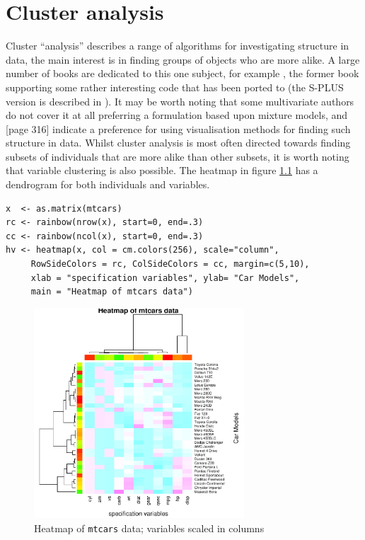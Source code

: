 \chapter{Cluster analysis}
\label{clustan}

Cluster ``analysis'' describes a range of algorithms for investigating structure in data, the main interest is in finding groups of objects who are more alike.  A large number of books are dedicated to this one subject, for example \cite{Kaufman+Rousseeuw:1989,Everitt+etal:2001,Gordon:1999}, the former book supporting some rather interesting code that has been ported to \R (the S-PLUS version is described in  \cite{Struyf+etal:1997}).   It may be worth noting that some multivariate authors do not cover it at all \cite{Flury:1997} preferring a formulation based upon mixture models, and [page 316] \cite{Venables+Ripley:2002} indicate a preference for using visualisation methods for finding such structure in data.  Whilst cluster analysis is most often directed towards finding subsets of individuals that are more alike than other subsets, it is worth noting that variable clustering is also possible.   The heatmap in figure \ref{heatmap} has a dendrogram for both individuals and variables.

\singlespacing
\begin{verbatim}
x  <- as.matrix(mtcars)
rc <- rainbow(nrow(x), start=0, end=.3)
cc <- rainbow(ncol(x), start=0, end=.3)
hv <- heatmap(x, col = cm.colors(256), scale="column",
     RowSideColors = rc, ColSideColors = cc, margin=c(5,10),
     xlab = "specification variables", ylab= "Car Models",
     main = "Heatmap of mtcars data")
\end{verbatim}
\onehalfspacing

\begin{figure}
\begin{center}
\includegraphics[width = 0.7\textwidth]{images/heatmap}
\caption{Heatmap of \texttt{mtcars} data; variables scaled in columns}
\label{heatmap}
\end{center}
\end{figure}

